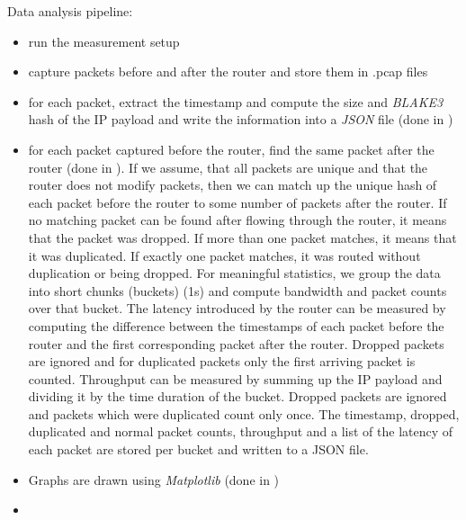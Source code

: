 
Data analysis pipeline:
\begin{itemize}
  \item run the measurement setup
  \item capture packets before and after the router and store them in .pcap files
  \item for each packet, extract the timestamp and compute the size and \textit{BLAKE3} \cite{wiki:BLAKE3} hash of the IP payload and write the information into a \textit{JSON} \cite{wiki:JSON} file (done in )
  \item for each packet captured before the router, find the same packet after the router (done in ). If we assume, that all packets are unique and that the router does not modify packets, then we can match up the unique hash of each packet before the router to some number of packets after the router. If no matching packet can be found after flowing through the router, it means that the packet was dropped. If more than one packet matches, it means that it was duplicated. If exactly one packet matches, it was routed without duplication or being dropped. For meaningful statistics, we group the data into short chunks (buckets) (1s) and compute bandwidth and packet counts over that bucket. The latency introduced by the router can be measured by computing the difference between the timestamps of each packet before the router and the first corresponding packet after the router. Dropped packets are ignored and for duplicated packets only the first arriving packet is counted. Throughput can be measured by summing up the IP payload  and dividing it by the time duration of the bucket. Dropped packets are ignored and packets which were duplicated count only once. The timestamp, dropped, duplicated and normal packet counts, throughput and a list of the latency of each packet are stored per bucket and written to a JSON file.
  \item Graphs are drawn using \textit{Matplotlib} \cite{Matplotlib} (done in )
  \item {}
\end{itemize}
